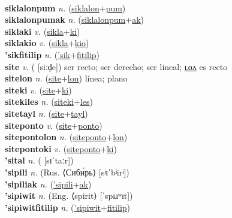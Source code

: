  \label{siklalon} \\
\textbf{siklalonpum} \textit{n.} (\hyperref[siklalon]{siklalon}+\hyperref[pum]{pum})
 \label{siklalonpum} \\
\textbf{siklalonpumak} \textit{n.} (\hyperref[siklalonpum]{siklalonpum}+\hyperref[ak]{ak})
 \label{siklalonpumak} \\
\textbf{siklaki} \textit{v.} (\hyperref[sikla]{sikla}+\hyperref[ki]{ki})
 \label{siklaki} \\
\textbf{siklakio} \textit{v.} (\hyperref[sikla]{sikla}+\hyperref[kio]{kio})
 \label{siklakio} \\
\textbf{'sikfitilip} \textit{n.} (\hyperref['sik]{'sik}+\hyperref[fitilip]{fitilip})
 \label{'sikfitilip} \\
\textbf{site} \textit{v.} ( [siːd̤e])
ser recto; ser derecho; ser lineal; \hyperref[sitelon]{ʟᴏᴧ} es recto \label{site} \\
\textbf{sitelon} \textit{n.} (\hyperref[site]{site}+\hyperref[lon]{lon})
línea; plano \label{sitelon} \\
\textbf{siteki} \textit{v.} (\hyperref[site]{site}+\hyperref[ki]{ki})
 \label{siteki} \\
\textbf{sitekiles} \textit{n.} (\hyperref[siteki]{siteki}+\hyperref[les]{les})
 \label{sitekiles} \\
\textbf{sitetayl} \textit{n.} (\hyperref[site]{site}+\hyperref[tayl]{tayl})
 \label{sitetayl} \\
\textbf{siteponto} \textit{v.} (\hyperref[site]{site}+\hyperref[ponto]{ponto})
 \label{siteponto} \\
\textbf{sitepontolon} \textit{n.} (\hyperref[siteponto]{siteponto}+\hyperref[lon]{lon})
 \label{sitepontolon} \\
\textbf{sitepontoki} \textit{v.} (\hyperref[siteponto]{siteponto}+\hyperref[ki]{ki})
 \label{sitepontoki} \\
\textbf{'sital} \textit{n.} ( [sɪˈtaːr])
 \label{'sital} \\
\textbf{'sipili} \textit{n.} (Rus. ⟨Сиби́рь⟩ [sʲɪˈbʲirʲ])
 \label{'sipili} \\
\textbf{'sipiliak} \textit{n.} (\hyperref['sipili]{'sipili}+\hyperref[ak]{ak})
 \label{'sipiliak} \\
\textbf{'sipiwit} \textit{n.} (Eng. ⟨spirit⟩ [ˈspɪɹʷɪt])
 \label{'sipiwit} \\
\textbf{'sipiwitfitilip} \textit{n.} (\hyperref['sipiwit]{'sipiwit}+\hyperref[fitilip]{fitilip})
 \label{'sipiwitfitilip} \\
